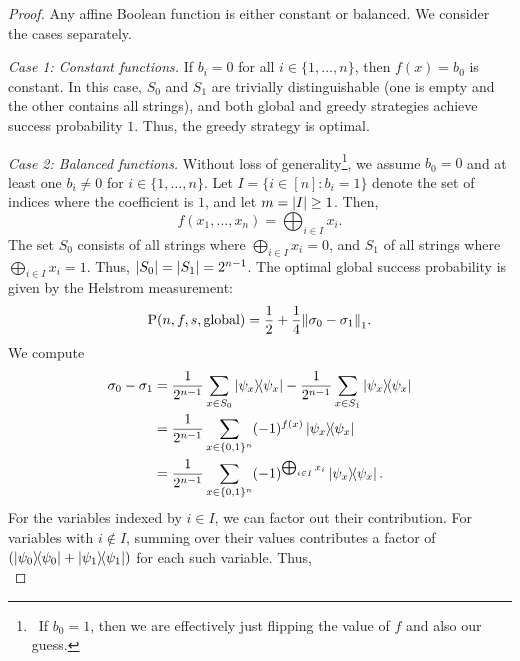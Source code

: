 \begin{proof}
    Any affine Boolean function is either constant or balanced.
    We consider the cases separately.

    \medskip
    \noindent\textit{Case 1: Constant functions.}
    If $b_i = 0$ for all $i \in \{1,\ldots,n\}$, then $f(x) = b_0$ is constant.
    In this case, $S_0$ and $S_1$ are trivially distinguishable (one is empty and the other contains all strings), and both global and greedy strategies achieve success probability $1$.
    Thus, the greedy strategy is optimal.

    \medskip
    \noindent\textit{Case 2: Balanced functions.}
    Without loss of generality\footnote{\
        If $b_0 = 1$, then we are effectively just flipping the value of $f$ and also our guess.
    }, we assume $b_0=0$ and at least one $b_i \neq 0$ for $i \in \{1,\ldots,n\}$.
    Let $I = \{i \in [n] : b_i = 1\}$ denote the set of indices where the coefficient is $1$, and let $m = \abs{I} \geq 1$.
    Then,
    \begin{equation}
        f(x_1,\ldots,x_n) = \bigoplus_{i \in I} x_i.
    \end{equation}
    The set $S_0$ consists of all strings where $\bigoplus_{i \in I} x_i = 0$, and $S_1$ of all strings where $\bigoplus_{i \in I} x_i = 1$.
    Thus, $\abs{S_0} = \abs{S_1} = 2^{n-1}$.
    The optimal global success probability is given by the Helstrom measurement:
    \begin{equation}
        \P(n,f,s,\glo) = \frac{1}{2} + \frac{1}{4}\norm*{\sigma_0 - \sigma_1}_1.
    \end{equation}
    We compute
    \begin{equation}
    \begin{aligned}
        \sigma_0 - \sigma_1 &= \frac{1}{2^{n-1}} \sum_{x \in S_0} \ketbra{\psi_x} - \frac{1}{2^{n-1}} \sum_{x \in S_1} \ketbra{\psi_x} \\
        &= \frac{1}{2^{n-1}} \sum_{x \in \{ 0, 1 \}^n} (-1)^{f(x)} \ketbra{\psi_x} \\
        &= \frac{1}{2^{n-1}} \sum_{x \in \{ 0, 1 \}^n} (-1)^{\bigoplus_{i \in I} x_i} \ketbra{\psi_x}.
    \end{aligned}
    \end{equation}
    For the variables indexed by $i \in I$, we can factor out their contribution.
    For variables with $i \notin I$, summing over their values contributes a factor of $\left( \ketbra{\psi_0} + \ketbra{\psi_1} \right)$ for each such variable.
    Thus,
    \begin{equation}

\end{equation}
\end{proof}
